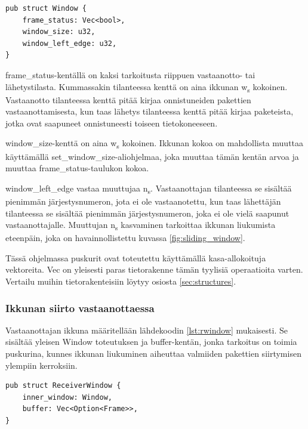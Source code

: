 \documentclass[a4paper,12pt]{article}
\begin{document}
    
\begin{lstlisting}[caption={Ikkunan rakenne}, label={lst:window}]
pub struct Window {
    frame_status: Vec<bool>,
    window_size: u32,
    window_left_edge: u32,
}\end{lstlisting}

frame\_status-kentällä on kaksi tarkoitusta riippuen vastaanotto- tai lähetystilasta. Kummassakin tilanteessa kenttä on aina ikkunan w\textsubscript{s} kokoinen. Vastaanotto tilanteessa kenttä pitää kirjaa onnistuneiden pakettien vastaanottamisesta, kun taas lähetys tilanteessa kenttä pitää kirjaa paketeista, jotka ovat saapuneet onnistuneesti toiseen tietokoneeseen.\par

window\_size-kenttä on aina w\textsubscript{s} kokoinen. Ikkunan kokoa on mahdollista muuttaa käyttämällä set\_window\_size-aliohjelmaa, joka muuttaa tämän kentän arvoa ja muuttaa frame\_status-taulukon kokoa.\par

window\_left\_edge vastaa muuttujaa n\textsubscript{s}. Vastaanottajan tilanteessa se sisältää pienimmän järjestysnumeron, jota ei ole vastaanotettu, kun taas lähettäjän tilanteessa se sisältää pienimmän järjestysnumeron, joka ei ole vielä saapunut vastaanottajalle. Muuttujan n\textsubscript{s} kasvaminen tarkoittaa ikkunan liukumista eteenpäin, joka on havainnollistettu kuvassa \ref{fig:sliding_window}. 

    \slidingWindow
    
    Tässä ohjelmassa puskurit ovat toteutettu käyttämällä kasa-allokoituja vektoreita. Vec on yleisesti paras tietorakenne tämän tyylisiä operaatioita varten. Vertailu muihin tietorakenteisiin löytyy osiosta \ref{sec:structures}.

\newpage

    \subsubsection*{Ikkunan siirto vastaanottaessa}

    Vastaanottajan ikkuna määritellään lähdekoodin \ref{lst:rwindow} mukaisesti. Se sisältää yleisen Window toteutuksen ja buffer-kentän, jonka tarkoitus on toimia puskurina, kunnes ikkunan liukuminen aiheuttaa valmiiden pakettien siirtymisen ylempiin kerroksiin. \par
    
\begin{lstlisting}[caption={Vastaanottajan ikkunan rakenne}, label={lst:rwindow}]
pub struct ReceiverWindow {
    inner_window: Window,
    buffer: Vec<Option<Frame>>,
}\end{lstlisting}
\end{document}
